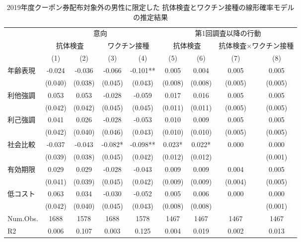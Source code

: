 \documentclass[
  11pt,
  a4paper,
]{article}
\begin{document}
\begin{table}

\caption{\label{tab:RegCoupon0}2019年度クーポン券配布対象外の男性に限定した 抗体検査とワクチン接種の線形確率モデルの推定結果}
\centering
\fontsize{9}{11}\selectfont
\begin{threeparttable}
\begin{tabular}[t]{lcccccccc}
\toprule
\multicolumn{1}{c}{ } & \multicolumn{4}{c}{意向} & \multicolumn{4}{c}{第1回調査以降の行動} \\
\cmidrule(l{3pt}r{3pt}){2-5} \cmidrule(l{3pt}r{3pt}){6-9}
\multicolumn{1}{c}{ } & \multicolumn{2}{c}{抗体検査} & \multicolumn{2}{c}{ワクチン接種} & \multicolumn{2}{c}{抗体検査} & \multicolumn{2}{c}{抗体検査×ワクチン接種} \\
\cmidrule(l{3pt}r{3pt}){2-3} \cmidrule(l{3pt}r{3pt}){4-5} \cmidrule(l{3pt}r{3pt}){6-7} \cmidrule(l{3pt}r{3pt}){8-9}
  & (1) & (2) & (3) & (4) & (5) & (6) & (7) & (8)\\
\midrule
年齢表現 & -0.024 & -0.036 & -0.066 & -0.101** & 0.005 & 0.004 & 0.005 & 0.005\\
 & (0.040) & (0.038) & (0.045) & (0.043) & (0.008) & (0.008) & (0.005) & (0.005)\\
利他強調 & 0.053 & 0.053 & -0.028 & -0.059 & 0.017 & 0.016 & 0.005 & 0.005\\
 & (0.042) & (0.042) & (0.045) & (0.045) & (0.011) & (0.011) & (0.005) & (0.005)\\
利己強調 & 0.041 & 0.026 & -0.028 & -0.053 & 0.010 & 0.009 & 0.005 & 0.005\\
 & (0.042) & (0.040) & (0.046) & (0.043) & (0.010) & (0.010) & (0.005) & (0.005)\\
社会比較 & -0.037 & -0.043 & -0.082* & -0.098** & 0.023* & 0.022* & 0.000 & 0.000\\
 & (0.039) & (0.038) & (0.045) & (0.042) & (0.012) & (0.012) &  & (0.001)\\
有効期限 & 0.029 & 0.029 & -0.028 & -0.043 & 0.009 & 0.009 & 0.004 & 0.005\\
 & (0.041) & (0.039) & (0.045) & (0.042) & (0.009) & (0.009) & (0.004) & (0.005)\\
低コスト & 0.063 & 0.034 & -0.030 & -0.052 & 0.005 & 0.006 & 0.000 & 0.000\\
 & (0.042) & (0.040) & (0.045) & (0.043) & (0.008) & (0.008) &  & (0.001)\\
\midrule
Num.Obs. & 1688 & 1578 & 1688 & 1578 & 1467 & 1467 & 1467 & 1467\\
R2 & 0.006 & 0.107 & 0.003 & 0.125 & 0.004 & 0.019 & 0.002 & 0.013\\

\end{tabular}
\end{threeparttable}
\end{table}
\end{document}
